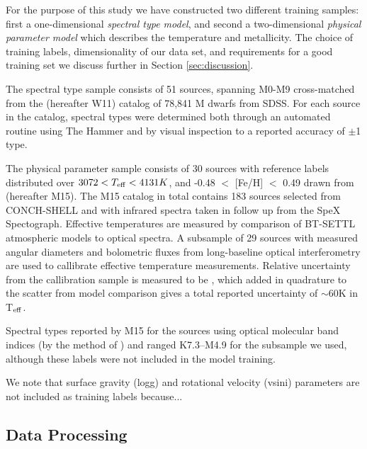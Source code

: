 \documentclass[modern]{aastex62}
\begin{document}
For the purpose of this study we have constructed two different training samples: first a one-dimensional \emph{spectral type model}, and second a two-dimensional \emph{physical parameter model} which describes the temperature and metallicity. The choice of training labels, dimensionality of our data set, and requirements for a good training set we discuss further in Section \ref{sec:discussion}.

The spectral type sample consists of 51 sources, spanning M0-M9 cross-matched from the \citealt{West:2011} (hereafter W11) catalog of 78,841 M dwarfs from SDSS. For each source in the catalog, spectral types were determined both through an automated routine using The Hammer \citep{Covey:2007} and by visual inspection to a reported accuracy of $\pm$1 type.

The physical parameter sample consists of 30 sources with reference labels distributed over $3072 < T_{\rm eff} < 4131K$, and -0.48 $<$ [Fe/H] $<$ 0.49 drawn from \citealt{Mann:2015} (hereafter M15). The M15 catalog in total contains 183 sources selected from CONCH-SHELL \citep{Gaidos:2013} and with infrared spectra taken in follow up from the SpeX Spectograph. Effective temperatures are measured by comparison of BT-SETTL atmospheric models \citep{Allard:2011} to optical spectra. A subsample of 29 sources with measured angular diameters and bolometric fluxes from long-baseline optical interferometry are used to callibrate effective temperature measurements. Relative uncertainty from the callibration sample is measured to be \color{red}{$\sim$30K (check this)}\color{black}, which added in quadrature to the scatter from model comparison gives a total reported uncertainty of $\sim$60K in T$_{\rm eff}$. 


Spectral types reported by M15 for the sources using optical molecular band indices (by the method of \citealt{Lepine:2013}) and ranged K7.3--M4.9 for the subsample we used, although these labels were not included in the model training.

We note that surface gravity (logg) and rotational velocity (vsini) parameters are not included as training labels because...


\subsection{Data Processing}
\end{document}
